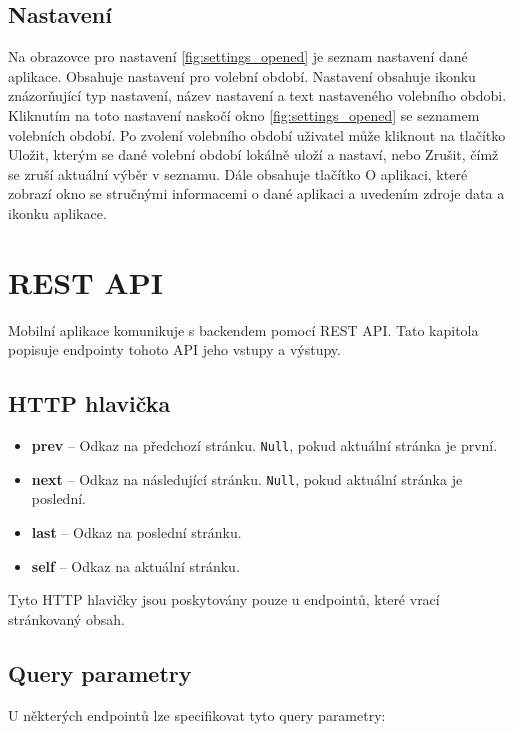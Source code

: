 \subsection*{Nastavení}
\label{ssec:design-settings}
	
Na obrazovce pro nastavení \ref{fig:settings_opened} je seznam nastavení dané aplikace. Obsahuje nastavení pro volební období. Nastavení obsahuje ikonku znázorňující typ nastavení, název nastavení a text nastaveného volebního obdobi. Kliknutím na toto nastavení naskočí okno \ref{fig:settings_opened} se seznamem volebních období. Po zvolení volebního období uživatel může kliknout na tlačítko Uložit, kterým se dané volební období lokálně uloží a nastaví, nebo Zrušit, čímž se zruší aktuální výběr \linebreak v seznamu. Dále obsahuje tlačítko O aplikaci, které zobrazí okno se stručnými informacemi \linebreak o dané aplikaci a uvedením zdroje data a ikonku aplikace.

\section{REST API}

Mobilní aplikace komunikuje s backendem pomocí REST API. Tato kapitola popisuje endpointy tohoto  API jeho vstupy a výstupy.

\subsection*{HTTP hlavička}

\begin{itemize}
	\item \textbf{prev} -- Odkaz na předchozí stránku. \lstinline|Null|, pokud aktuální stránka je první.
	\item \textbf{next} -- Odkaz na následující stránku. \lstinline|Null|, pokud aktuální stránka je poslední.
	\item \textbf{last} -- Odkaz na poslední stránku.
	\item \textbf{self} -- Odkaz na aktuální stránku.
\end{itemize}

\noindent Tyto HTTP hlavičky jsou poskytovány pouze u endpointů, které vrací stránkovaný obsah.

\subsection*{Query parametry}
U některých endpointů lze specifikovat tyto query parametry:

